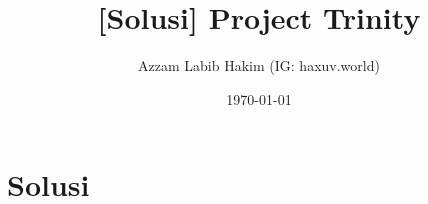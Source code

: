 

\title{[Solusi] Project Trinity}
\author{Azzam Labib Hakim (IG: haxuv.world)}
\date{\today}



\maketitle

\renewcommand*\contentsname{Daftar Isi}
\tableofcontents

\newpage
\section{Solusi}


